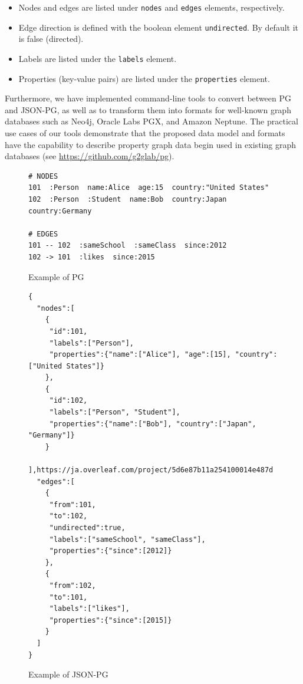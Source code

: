 \documentclass[runningheads]{llncs}
\begin{document}
\begin{itemize}
    \item Nodes and edges are listed under \texttt{nodes} and \texttt{edges} elements, respectively.
    \item Edge direction is defined with the boolean element \texttt{undirected}. By default it is false (directed).
    \item Labels are listed under the \texttt{labels} element.
    \item Properties (key-value pairs) are listed under the \texttt{properties} element.
\end{itemize}

Furthermore, we have implemented command-line tools to convert between PG and JSON-PG, as well as to transform them into formats for well-known graph databases such as Neo4j, Oracle Labs PGX, and Amazon Neptune. The practical use cases of our tools demonstrate that the proposed data model and formats have the capability to describe property graph data begin used in existing graph databases (see \url{https://github.com/g2glab/pg}).

\begin{figure}[!t]
\begin{scriptsize}
\begin{verbatim}
# NODES
101  :Person  name:Alice  age:15  country:"United States"
102  :Person  :Student  name:Bob  country:Japan  country:Germany

# EDGES
101 -- 102  :sameSchool  :sameClass  since:2012
102 -> 101  :likes  since:2015
\end{verbatim}
\end{scriptsize}
\caption{Example of PG}
\label{fig:example-pg}
\end{figure}

\begin{figure}[!t]
\begin{scriptsize}
\begin{verbatim}
{
  "nodes":[
    {
     "id":101,
     "labels":["Person"],
     "properties":{"name":["Alice"], "age":[15], "country":["United States"]}
    },
    {
     "id":102,
     "labels":["Person", "Student"],
     "properties":{"name":["Bob"], "country":["Japan", "Germany"]}
    }
  ],https://ja.overleaf.com/project/5d6e87b11a254100014e487d
  "edges":[
    {
     "from":101,
     "to":102,
     "undirected":true,
     "labels":["sameSchool", "sameClass"],
     "properties":{"since":[2012]}
    },
    {
     "from":102,
     "to":101,
     "labels":["likes"],
     "properties":{"since":[2015]}
    }
  ]
}
\end{verbatim}
\end{scriptsize}
\caption{Example of JSON-PG}
\label{fig:example-json}
\end{figure}
\end{document}
